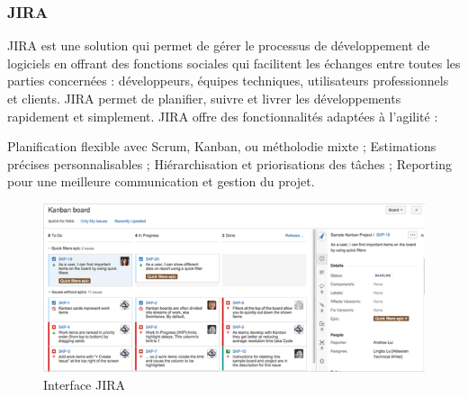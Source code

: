 \subsubsection{JIRA}

JIRA est une solution qui permet de gérer le processus de développement de logiciels en offrant des fonctions sociales qui facilitent les échanges entre toutes les parties concernées : développeurs, équipes techniques, utilisateurs professionnels et clients. JIRA permet de planifier, suivre et livrer les développements rapidement et simplement. JIRA offre des fonctionnalités adaptées à l'agilité :
\begin{itemize}
	\itemcheck Planification flexible avec Scrum, Kanban, ou métholodie mixte ;
	\itemcheck Estimations précises personnalisables ;
	\itemcheck Hiérarchisation et priorisations des tâches ;
	\itemcheck Reporting pour une meilleure communication et gestion du projet.
\end{itemize}
\begin{figure}[H]
	\centering
	\begin{minipage}{12cm}
		\centering
		\includegraphics[width=1\textwidth]{fig/jira.png}
	\end{minipage}
	\caption{Interface JIRA}
	\label{fig:vdsadf}
\end{figure}
